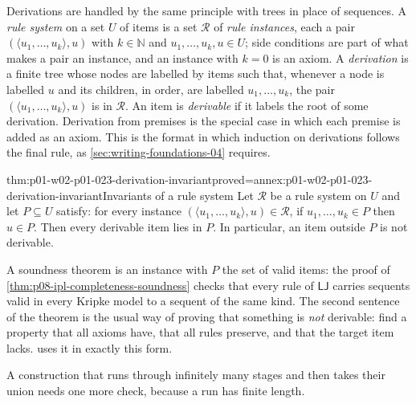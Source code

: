Derivations are handled by the same principle with trees in place of
sequences. A \emph{rule system} on a set \(U\) of items is a set
\(\mathcal R\) of \emph{rule instances}, each a pair
\((\langle u_1,\ldots,u_k\rangle,u)\) with \(k\in\mathbb N\) and
\(u_1,\ldots,u_k,u\in U\); side conditions are part of what makes a pair an
instance, and an instance with \(k=0\) is an axiom. A \emph{derivation} is a
finite tree whose nodes are labelled by items such that, whenever a node is
labelled \(u\) and its children, in order, are labelled
\(u_1,\ldots,u_k\), the pair \((\langle u_1,\ldots,u_k\rangle,u)\) is in
\(\mathcal R\). An item is \emph{derivable} if it labels the root of some
derivation. Derivation from premises is the special case in which each
premise is added as an axiom. This is the format in which induction on
derivations follows the final rule, as \cref{sec:writing-foundations-04}
requires.

\begin{hbtheorem}{thm:p01-w02-p01-023-derivation-invariant}{proved=annex:p01-w02-p01-023-derivation-invariant}{Invariants of a rule system}
Let \(\mathcal R\) be a rule system on \(U\) and let \(P\subseteq U\)
satisfy: for every instance \((\langle u_1,\ldots,u_k\rangle,u)\in\mathcal R\),
if \(u_1,\ldots,u_k\in P\) then \(u\in P\). Then every derivable item lies in
\(P\). In particular, an item outside \(P\) is not derivable.
\end{hbtheorem}

A soundness theorem is an instance with \(P\) the set of valid items: the
proof of \cref{thm:p08-ipl-completeness-soundness} checks that every rule of
\(\mathsf{LJ}\) carries sequents valid in every Kripke model to a sequent
of the same kind. The second sentence of the theorem is the usual way of
proving that something is \emph{not} derivable: find a property that all
axioms have, that all rules preserve, and that the target item lacks.
 uses it in exactly this form.

A construction that runs through infinitely many stages and then takes their
union needs one more check, because a run has finite length.

